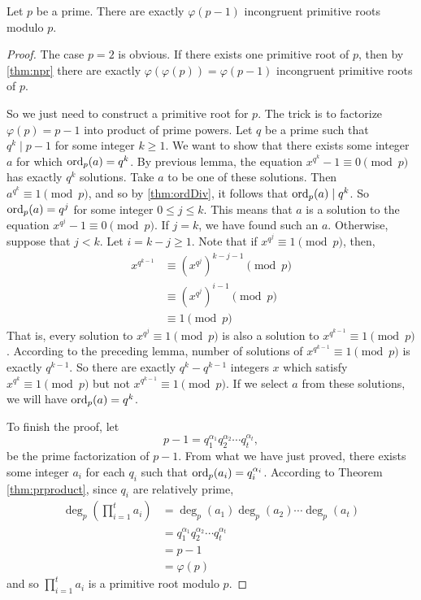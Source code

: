 \documentclass{subfile}
\begin{document}
	\begin{theorem}\label{thm:primeprimitive}
		Let $p$ be a prime. There are exactly $\varphi(p-1)$ incongruent primitive roots modulo $p$.
	\end{theorem}

	\begin{proof}
		The case $p=2$ is obvious. If there exists one primitive root of $p$, then by \autoref{thm:npr} there are exactly $\varphi(\varphi(p))=\varphi(p-1)$ incongruent primitive roots of $p$.

		So we just need to construct a primitive root for $p$. The trick is to factorize $\varphi(p)=p-1$ into product of prime powers. Let $q$ be a prime such that $q^k \mid p-1$ for some integer $k \geq 1$. We want to show that there exists some integer $a$ for which $\operatorname{ord}_p(a)=q^k$. By previous lemma, the equation $x^{q^k} - 1 \equiv 0 \pmod p$ has exactly $q^k$ solutions. Take $a$ to be one of these solutions. Then $a^{q^k} \equiv 1 \pmod p$, and so by \autoref{thm:ordDiv}, it follows that $\operatorname{ord}_p(a)\mid q^k$. So $\operatorname{ord}_p(a)=q^j$ for some integer $0 \leq j \leq k$. This means that $a$ is a solution to the equation $x^{q^j} - 1 \equiv 0 \pmod p$. If $j=k$, we have found such an $a$. Otherwise, suppose that $j<k$. Let $i=k-j\geq 1$. Note that if $x^{q^j} \equiv 1 \pmod p$, then,
			\begin{align*}
				x^{q^{k-1}}
					& \equiv \left(x^{q^j}\right)^{k-j-1}\pmod{p}\\
					& \equiv \left(x^{q^j}\right)^{i-1}\pmod{p}\\
					& \equiv 1 \pmod p
			\end{align*}
		That is, every solution to $x^{q^j} \equiv 1 \pmod p$ is also a solution to $x^{q^{k-1}} \equiv 1 \pmod p$. According to the preceding lemma, number of solutions of $x^{q^{k-1}} \equiv 1 \pmod p$ is exactly $q^{k-1}$. So there are exactly $q^k - q^{k-1}$ integers $x$ which satisfy $x^{q^k} \equiv 1 \pmod p$ but not $x^{q^{k-1}} \equiv 1 \pmod p$. If we select $a$ from these solutions, we will have $\operatorname{ord}_p(a)=q^k$.

		To finish the proof, let $$p-1 = q_1^{\alpha_1}q_2^{\alpha_2} \cdots q_t^{\alpha_t},$$ be the prime factorization of $p-1$. From what we have just proved, there exists some integer $a_i$ for each $q_i$ such that $\operatorname{ord}_p(a_i)=q_i^{\alpha_i}$. According to Theorem \eqref{thm:prproduct}, since $q_i$ are relatively prime,
			\begin{align*}
				\deg_p\left(\prod_{i=1}^{t}a_i\right)
					& = \deg_p(a_1) \deg_p(a_2) \cdots \deg_p(a_t)\\
					& = q_1^{\alpha_1}q_2^{\alpha_2} \cdots q_t^{\alpha_t}\\
					& = p-1\\
					& =\varphi(p)
			\end{align*}
		and so $\prod_{i=1}^{t}a_i$ is a primitive root modulo $p$.
	\end{proof}
\end{document}
